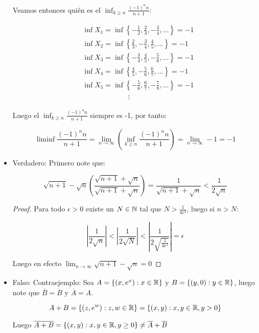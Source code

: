 \begin{itemize}[label={✎},leftmargin=*]
        Veamos entonces quién es el $\inf_{k\geq n} \frac{(-1)^nn}{n+1}$:

        \begin{align*}
            &\inf X_1=\inf \left\{-\frac{1}{2},\frac{2}{3},-\frac{3}{4},\ldots\right\}=-1\\
            &\inf X_2=\inf \left\{\frac{2}{3},-\frac{3}{4},\frac{4}{5},\ldots\right\}=-1\\
            &\inf X_3=\inf \left\{-\frac{3}{4},\frac{4}{5},-\frac{5}{6},\ldots\right\}=-1\\
            &\inf X_4=\inf \left\{\frac{4}{5},-\frac{5}{6},\frac{6}{7},\ldots\right\}=-1\\
            &\inf X_5=\inf \left\{-\frac{5}{6},\frac{6}{7},-\frac{7}{8},\ldots\right\}=-1\\
            & \mathrel{\phantom{=askaldfjasl}}\vdots
        \end{align*}

        Luego el $\inf_{k\geq n} \frac{(-1)^nn}{n+1}$ siempre es -1, por tanto:

        $$\liminf \frac{(-1)^n n}{n+1}=\lim _{n \rightarrow \infty}\left(\inf_{k \geq n} \frac{(-1)^nn}{n+1}\right)=\lim_{n \to \infty} -1=-1$$




    \item Verdadero: Primero note que:

    $$\sqrt{n+1}-\sqrt{n} \left(\frac{\sqrt{n+1}+\sqrt{n}  }{\sqrt{n+1}+\sqrt{n} } \right)=\frac{1}{\sqrt{n+1}+\sqrt{n}}<\frac{1}{2\sqrt{n}}$$


    \begin{proof}
    
    Para todo $\epsilon>0$ existe un  $N\in  \mathbb{N}$ tal que $N>\frac{1}{4\epsilon^2}$, luego si $n>N$:

        $$\left|\frac{1}{2\sqrt{n} }\right|<\left|\frac{1}{2\sqrt{N} }\right|<\left|\frac{1}{2\sqrt{\frac{1}{4\epsilon^2}} }\right|=\epsilon$$


Luego en efecto $\lim_{n \to \infty} \sqrt{n+1}-\sqrt{n}=0   $
    \end{proof}

    

    \item Falso: Contraejemplo: Sea $A=\{(x,e^x) : x\in \mathbb{R}\}$ y $B=\{(y,0): y\in \mathbb{R}\}$, luego note que $\overline{B}=B$ y $\overline{A}=A$.

    $$A+B=\{(z,e^w): z,w\in \mathbb{R}\}=\{(x,y): x,y\in \mathbb{R}, y>0 \}$$

    Luego $\overline{A+B}=\{(x,y):x,y\in \mathbb{R},y\geq0\}\neq\overline{A}+\overline{B}$



\end{itemize}


